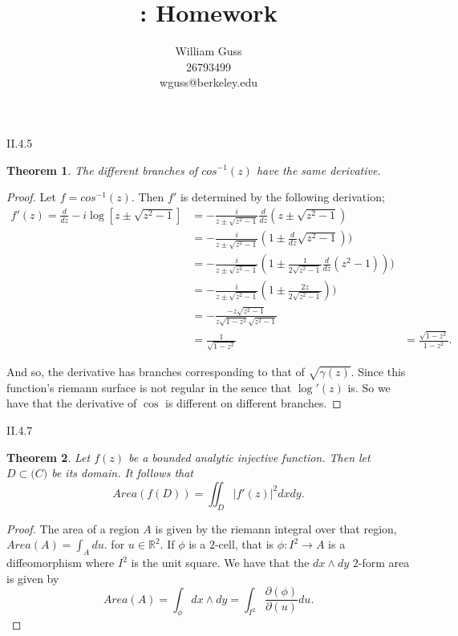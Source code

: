 \documentclass[letter]{article}
\title{\bCLASS: Homework \bHWN}
\author{William Guss\\26793499\\wguss@berkeley.edu}
\newtheorem{theorem}{Theorem}
\newenvironment{menumerate}{%
  \edef\backupindent{\the\parindent}%
  \enumerate%
  \setlength{\parindent}{\backupindent}%
}{\endenumerate}
\begin{document}
\maketitle
\thispagestyle{empty}

\begin{menumerate}

\item II.4.5
\begin{theorem}
    The different branches of $cos^{-1}(z)$ have the same derivative.
\end{theorem}
\begin{proof}
    Let $f = cos^{-1}(z).$ Then $f'$ is determined by the following derivation;
    \begin{equation*}
        \begin{aligned}
            f'(z) = \frac{d}{dz} -i\log[z \pm \sqrt{z^2 - 1}] &= -\frac{i}{z \pm \sqrt{z^2 -1}}\frac{d}{dz}(z \pm \sqrt{z^2 -1}) \\
            &= -\frac{i}{z \pm \sqrt{z^2 -1}}(1 \pm \frac{d}{dz}\sqrt{z^2 -1})) \\
            &= -\frac{i}{z \pm \sqrt{z^2 -1}}(1 \pm \frac{1}{2\sqrt{z^2 -1}}\frac{d}{dz}(z^2 -1))) \\
            &= -\frac{i}{z \pm \sqrt{z^2 -1}}(1 \pm \frac{2z}{2\sqrt{z^2 -1}})) \\
            &= -\frac{-z\sqrt{z^2-1}}{z \sqrt{1-z^2}\sqrt{z^2-1}} \\
            &= \frac{1}{\sqrt{1-z^2}}
            &= \frac{\sqrt{1-z^2}}{1-z^2}.
        \end{aligned}
    \end{equation*}

        And so, the derivative has branches corresponding to that of $\sqrt{\gamma(z)}.$ Since this function's riemann surface
        is not regular in the sence that $\log'(z)$ is. So we have that the derivative of $\cos$ is different on different branches.

\end{proof}
\item II.4.7
\begin{theorem}
 Let $f(z)$ be a bounded analytic injective function. Then let $D \subset \mathbb(C)$ be its domain. 
 It follows that 
 \begin{equation}
    Area(f(D)) = \iint_D |f'(z)|^2 dxdy.
 \end{equation}
\end{theorem}
\begin{proof}
    The area of a region $A$ is given by the riemann integral over that region,
    $Area(A) = \int_A du.$ for $u \in \mathbb{R}^2.$ If $\phi$ is a $2$-cell, that is 
    $\phi: I^2 \to A$ is a diffeomorphism where $I^2$ is the unit square. We have that the $dx\wedge dy$
    $2$-form area is given by 
    \begin{equation}
        Area(A) = \int_\phi dx \wedge dy = \int_{I^2} \frac{\partial(\phi)}{\partial(u)} du.    
    \end{equation}    


\end{proof}
\end{menumerate}
\end{document}
